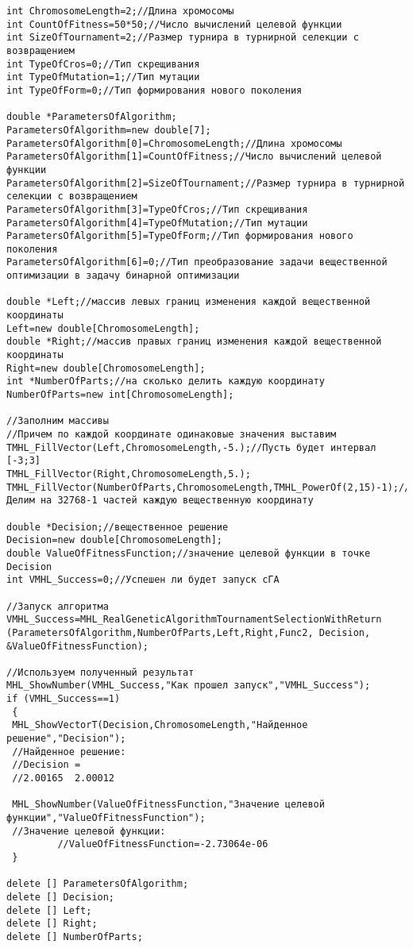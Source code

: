 \documentclass[a4paper,12pt]{article}
\begin{document}
\begin{lstlisting}[label=code_use_MHL_RealGeneticAlgorithmTournamentSelectionWithReturn,caption=Пример использования]
int ChromosomeLength=2;//Длина хромосомы
int CountOfFitness=50*50;//Число вычислений целевой функции
int SizeOfTournament=2;//Размер турнира в турнирной селекции с возвращением 
int TypeOfCros=0;//Тип скрещивания
int TypeOfMutation=1;//Тип мутации
int TypeOfForm=0;//Тип формирования нового поколения

double *ParametersOfAlgorithm;
ParametersOfAlgorithm=new double[7];
ParametersOfAlgorithm[0]=ChromosomeLength;//Длина хромосомы
ParametersOfAlgorithm[1]=CountOfFitness;//Число вычислений целевой функции
ParametersOfAlgorithm[2]=SizeOfTournament;//Размер турнира в турнирной селекции с возвращением 
ParametersOfAlgorithm[3]=TypeOfCros;//Тип скрещивания
ParametersOfAlgorithm[4]=TypeOfMutation;//Тип мутации
ParametersOfAlgorithm[5]=TypeOfForm;//Тип формирования нового поколения
ParametersOfAlgorithm[6]=0;//Тип преобразование задачи вещественной оптимизации в задачу бинарной оптимизации

double *Left;//массив левых границ изменения каждой вещественной координаты
Left=new double[ChromosomeLength];
double *Right;//массив правых границ изменения каждой вещественной координаты
Right=new double[ChromosomeLength];
int *NumberOfParts;//на сколько делить каждую координату
NumberOfParts=new int[ChromosomeLength];

//Заполним массивы
//Причем по каждой координате одинаковые значения выставим
TMHL_FillVector(Left,ChromosomeLength,-5.);//Пусть будет интервал [-3;3]
TMHL_FillVector(Right,ChromosomeLength,5.);
TMHL_FillVector(NumberOfParts,ChromosomeLength,TMHL_PowerOf(2,15)-1);//Делим на 32768-1 частей каждую вещественную координату

double *Decision;//вещественное решение
Decision=new double[ChromosomeLength];
double ValueOfFitnessFunction;//значение целевой функции в точке Decision
int VMHL_Success=0;//Успешен ли будет запуск cГА

//Запуск алгоритма
VMHL_Success=MHL_RealGeneticAlgorithmTournamentSelectionWithReturn (ParametersOfAlgorithm,NumberOfParts,Left,Right,Func2, Decision, &ValueOfFitnessFunction);

//Используем полученный результат
MHL_ShowNumber(VMHL_Success,"Как прошел запуск","VMHL_Success");
if (VMHL_Success==1)
 {
 MHL_ShowVectorT(Decision,ChromosomeLength,"Найденное решение","Decision");
 //Найденное решение:
 //Decision =
 //2.00165	2.00012

 MHL_ShowNumber(ValueOfFitnessFunction,"Значение целевой функции","ValueOfFitnessFunction");
 //Значение целевой функции:
		 //ValueOfFitnessFunction=-2.73064e-06
 }

delete [] ParametersOfAlgorithm;
delete [] Decision;
delete [] Left;
delete [] Right;
delete [] NumberOfParts;
\end{lstlisting}
\end{document}

